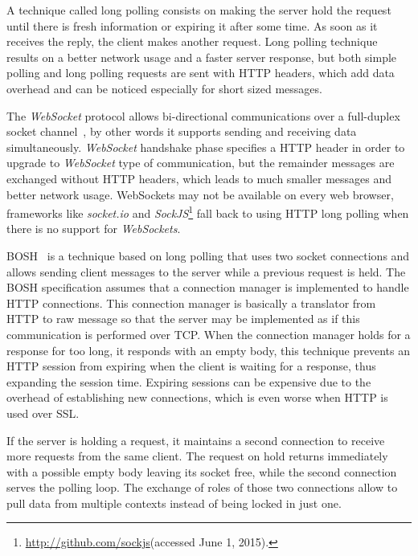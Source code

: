 A technique called long polling consists on making the server hold the request until there is fresh information or expiring it after some time.
As soon as it receives the reply, the client makes another request. Long polling technique results on a better network usage and a faster server response, but both simple polling and long polling requests are sent with \ac{HTTP} headers, which add data overhead and can be noticed especially for short sized messages.

The \emph{WebSocket} protocol allows bi-directional communications over a full-duplex socket channel~\cite{rfc6455}, by other words it supports sending and receiving data simultaneously.
 \emph{WebSocket} handshake phase specifies a \ac{HTTP} header in order to upgrade to \emph{WebSocket} type of communication, but the remainder messages are exchanged without \ac{HTTP} headers, which leads to much smaller messages and better network usage. WebSockets may not be available on every web browser, frameworks like \emph{socket.io} and \emph{SockJS}\footnote{\url{http://github.com/sockjs}(accessed June 1, 2015).} fall back to using \ac{HTTP} long polling when there is no support for \emph{WebSockets}. 

  \ac{BOSH}~\cite{xep0124} is a technique based on long polling that uses two socket connections and allows sending client messages to the server while a previous request is held.
  The \ac{BOSH} specification assumes that a connection manager is implemented to handle \ac{HTTP} connections. This connection manager is basically a translator from \ac{HTTP} to raw message so that the server may be implemented as if this communication is performed over \ac{TCP}.
  When the connection manager holds for a response for too long, it responds with an empty body, this technique prevents an \ac{HTTP} session from expiring when the client is waiting for a response, thus expanding the session time. Expiring sessions can be expensive due to the overhead of establishing new connections, which is even worse when \ac{HTTP} is used over \ac{SSL}.

  If the server is holding a request, it maintains a second connection to receive more requests from the same client. The request on hold returns immediately with a possible empty body leaving its socket free, while the second connection serves the polling loop. The exchange of roles of those two connections allow to pull data from multiple contexts instead of being locked in just one.

